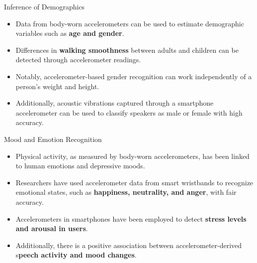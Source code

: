 \documentclass[ucs,9pt]{beamer}
\begin{document}
\begin{frame}{Inference of Demographics}
 \begin{itemize}
	\item Data from body-worn accelerometers can be used to estimate demographic variables such as \textbf{age and gender}.  
	\item Differences in \textbf{walking smoothness} between adults and children
	can be detected through accelerometer readings. 
	\item  Notably, accelerometer-based gender recognition can work independently of a person’s weight and height. 
	\item Additionally, acoustic vibrations captured
	through a smartphone accelerometer can be used to classify
	speakers as male or female with high accuracy.
 \end{itemize}
\end{frame}


\begin{frame}{Mood and Emotion Recognition}
	\begin{itemize}
		\item Physical activity, as measured by body-worn accelerometers, has been linked to human emotions and depressive moods. 
		\item Researchers have used accelerometer data from smart
		wristbands to recognize emotional states, such as \textbf{happiness,
		neutrality, and anger}, with fair accuracy.
		\item  Accelerometers in smartphones have been employed to detect \textbf{stress levels and arousal in users}. 
		\item Additionally, there is a positive association between accelerometer-derived s\textbf{peech activity and mood changes}.
	\end{itemize}
\end{frame}
\end{document}

